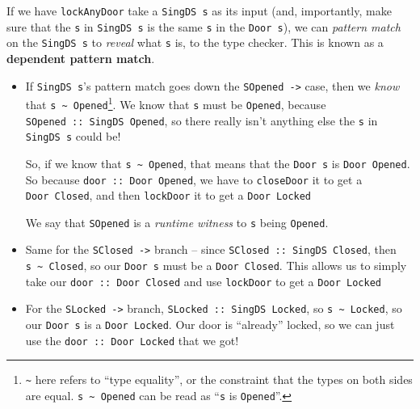\documentclass[]{article}
\begin{document}
If we have \texttt{lockAnyDoor} take a \texttt{SingDS\ s} as its input (and,
importantly, make sure that the \texttt{s} in \texttt{SingDS\ s} is the same
\texttt{s} in the \texttt{Door\ s}), we can \emph{pattern match} on the
\texttt{SingDS\ s} to \emph{reveal} what \texttt{s} is, to the type checker.
This is known as a \textbf{dependent pattern match}.

\begin{itemize}
\item
  If \texttt{SingDS\ s}'s pattern match goes down the
  \texttt{SOpened\ -\textgreater{}} case, then we \emph{know} that
  \texttt{s\ \textasciitilde{}\ \textquotesingle{}Opened}\footnote{\texttt{\textasciitilde{}}
    here refers to ``type equality'', or the constraint that the types on both
    sides are equal. \texttt{s\ \textasciitilde{}\ \textquotesingle{}Opened} can
    be read as ``\texttt{s} is \texttt{\textquotesingle{}Opened}''.}. We know
  that \texttt{s} must be \texttt{\textquotesingle{}Opened}, because
  \texttt{SOpened\ ::\ SingDS\ \textquotesingle{}Opened}, so there really isn't
  anything else the \texttt{s} in \texttt{SingDS\ s} could be!

  So, if we know that \texttt{s\ \textasciitilde{}\ \textquotesingle{}Opened},
  that means that the \texttt{Door\ s} is
  \texttt{Door\ \textquotesingle{}Opened}. So because
  \texttt{door\ ::\ Door\textquotesingle{}\ Opened}, we have to
  \texttt{closeDoor} it to get a \texttt{Door\textquotesingle{}\ Closed}, and
  then \texttt{lockDoor} it to get a \texttt{Door\ \textquotesingle{}Locked}

  We say that \texttt{SOpened} is a \emph{runtime witness} to \texttt{s} being
  \texttt{\textquotesingle{}Opened}.
\item
  Same for the \texttt{SClosed\ -\textgreater{}} branch -- since
  \texttt{SClosed\ ::\ SingDS\ \textquotesingle{}Closed}, then
  \texttt{s\ \textasciitilde{}\ \textquotesingle{}Closed}, so our
  \texttt{Door\ s} must be a \texttt{Door\ \textquotesingle{}Closed}. This
  allows us to simply take our \texttt{door\ ::\ Door\ \textquotesingle{}Closed}
  and use \texttt{lockDoor} to get a \texttt{Door\ \textquotesingle{}Locked}
\item
  For the \texttt{SLocked\ -\textgreater{}} branch,
  \texttt{SLocked\ ::\ SingDS\ \textquotesingle{}Locked}, so
  \texttt{s\ \textasciitilde{}\ \textquotesingle{}Locked}, so our
  \texttt{Door\ s} is a \texttt{Door\ \textquotesingle{}Locked}. Our door is
  ``already'' locked, so we can just use the
  \texttt{door\ ::\ Door\ \textquotesingle{}Locked} that we got!
\end{itemize}
\end{document}

